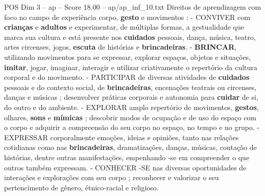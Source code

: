\begin{textsample}{POS Dim 3 – ap – Score 18.00 – ap/ap\_inf\_10.txt}
Direitos de aprendizagem com foco no campo de experiência corpo, \textbf{gesto} e movimentos : - CONVIVER com \textbf{crianças} e \textbf{adultos} e experimentar, de múltiplas formas, a gestualidade que marca sua cultura e está presente nos \textbf{cuidados} pessoais, dança, música, teatro, artes circenses, jogos, \textbf{escuta} de histórias e \textbf{brincadeiras}. - \textbf{BRINCAR}, utilizando movimentos para se expressar, explorar espaços, objetos e situações, \textbf{imitar}, jogar, imaginar, interagir e utilizar criativamente o repertório da cultura corporal e do movimento. - PARTICIPAR de diversas atividades de \textbf{cuidados} pessoais e do contexto social, de \textbf{brincadeiras}, encenações teatrais ou circenses, danças e músicas ; desenvolver práticas corporais e autonomia para \textbf{cuidar} de si, do outro e do ambiente. - EXPLORAR amplo repertório de movimentos, \textbf{gestos}, olhares, \textbf{sons} e \textbf{mímicas} ; descobrir modos de ocupação e de uso do espaço com o corpo e adquirir a compreensão do seu corpo no espaço, no tempo e no grupo. - EXPRESSAR corporalmente emoções, ideias e opiniões, tanto nas relações cotidianas como nas \textbf{brincadeiras}, dramatizações, danças, músicas, contação de histórias, dentre outras manifestações, empenhando -se em compreender o que outros também expressam. - CONHECER -SE nas diversas oportunidades de interações e explorações com seu corpo ; reconhecer e valorizar o seu pertencimento de gênero, étnico-racial e religioso.

\end{textsample}
